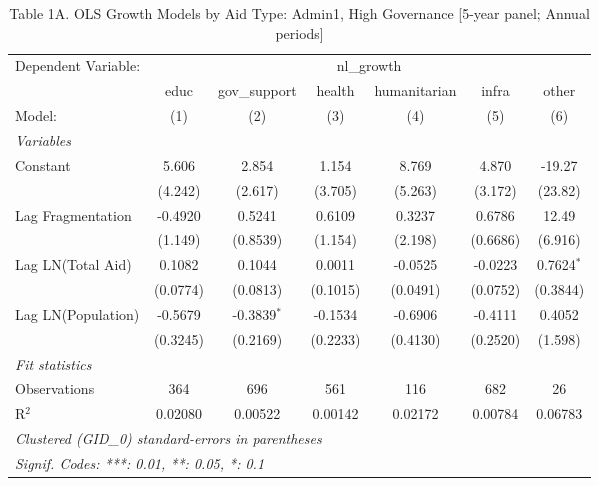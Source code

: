
\begin{table}[H]
   \caption{Table 1A. OLS Growth Models by Aid Type: Admin1, High Governance [5-year panel; Annual periods]}
   \centering
   \begin{tabular}{lcccccc}
      \tabularnewline \midrule \midrule
      Dependent Variable: & \multicolumn{6}{c}{nl\_growth}\\
                         & educ     & gov\_support  & health   & humanitarian & infra    & other \\   
      Model:             & (1)      & (2)           & (3)      & (4)          & (5)      & (6)\\  
      \midrule
      \emph{Variables}\\
      Constant           & 5.606    & 2.854         & 1.154    & 8.769        & 4.870    & -19.27\\   
                         & (4.242)  & (2.617)       & (3.705)  & (5.263)      & (3.172)  & (23.82)\\   
      Lag Fragmentation  & -0.4920  & 0.5241        & 0.6109   & 0.3237       & 0.6786   & 12.49\\   
                         & (1.149)  & (0.8539)      & (1.154)  & (2.198)      & (0.6686) & (6.916)\\   
      Lag LN(Total Aid)  & 0.1082   & 0.1044        & 0.0011   & -0.0525      & -0.0223  & 0.7624$^{*}$\\   
                         & (0.0774) & (0.0813)      & (0.1015) & (0.0491)     & (0.0752) & (0.3844)\\   
      Lag LN(Population) & -0.5679  & -0.3839$^{*}$ & -0.1534  & -0.6906      & -0.4111  & 0.4052\\   
                         & (0.3245) & (0.2169)      & (0.2233) & (0.4130)     & (0.2520) & (1.598)\\   
      \midrule
      \emph{Fit statistics}\\
      Observations       & 364      & 696           & 561      & 116          & 682      & 26\\  
      R$^2$              & 0.02080  & 0.00522       & 0.00142  & 0.02172      & 0.00784  & 0.06783\\  
      \midrule \midrule
      \multicolumn{7}{l}{\emph{Clustered (GID\_0) standard-errors in parentheses}}\\
      \multicolumn{7}{l}{\emph{Signif. Codes: ***: 0.01, **: 0.05, *: 0.1}}\\
   \end{tabular}
\end{table}


